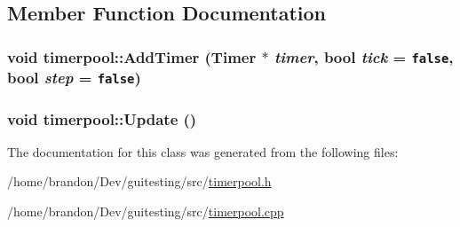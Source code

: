 \subsection{Member Function Documentation}
\hypertarget{classtimerpool_c3c343baa7b4c5f8786a542b402b3457}{
\subsubsection[{AddTimer}]{\setlength{\rightskip}{0pt plus 5cm}void timerpool::AddTimer ({\bf Timer} $\ast$ {\em timer}, \/  bool {\em tick} = {\tt false}, \/  bool {\em step} = {\tt false})}}
\label{classtimerpool_c3c343baa7b4c5f8786a542b402b3457}


\hypertarget{classtimerpool_550b453873442d702dfeb387297d2d82}{
\subsubsection[{Update}]{\setlength{\rightskip}{0pt plus 5cm}void timerpool::Update ()}}
\label{classtimerpool_550b453873442d702dfeb387297d2d82}




The documentation for this class was generated from the following files:\begin{CompactItemize}
\item 
/home/brandon/Dev/guitesting/src/\hyperlink{timerpool_8h}{timerpool.h}\item 
/home/brandon/Dev/guitesting/src/\hyperlink{timerpool_8cpp}{timerpool.cpp}\end{CompactItemize}

